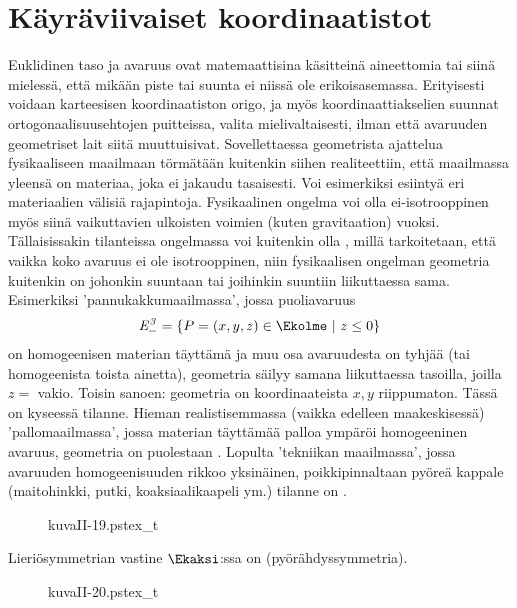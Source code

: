\section{Käyräviivaiset koordinaatistot} \label{koordinaatistot}
\alku
Euklidinen taso ja avaruus ovat matemaattisina käsitteinä aineettomia tai  
siinä mielessä, että mikään piste tai suunta ei niissä ole erikoisasemassa. Erityisesti voidaan
karteesisen koordinaatiston origo, ja myös koordinaattiakselien suunnat 
ortogonaalisuusehtojen puitteissa, valita mielivaltaisesti, ilman että avaruuden geometriset 
lait siitä muuttuisivat. Sovellettaessa geometrista ajattelua fysikaaliseen maailmaan törmätään
kuitenkin siihen realiteettiin, että maailmassa yleensä on materiaa, joka ei jakaudu tasaisesti.
Voi esimerkiksi esiintyä eri materiaalien välisiä rajapintoja. Fysikaalinen ongelma voi olla
ei-isotrooppinen myös siinä vaikuttavien ulkoisten voimien (kuten gravitaation) vuoksi. 
Tällaisissakin tilanteissa ongelmassa voi kuitenkin olla , millä tarkoitetaan,
että vaikka koko avaruus ei ole isotrooppinen, niin fysikaalisen ongelman geometria kuitenkin on
johonkin suuntaan tai joihinkin suuntiin liikuttaessa sama. Esimerkiksi 'pannukakkumaailmassa',
jossa puoliavaruus
\[
\mathit{E}_-^{\mathit{3}} = \{P=(x,y,z) \in \Ekolme \ | \ z \leq 0 \}
\]
on homogeenisen materian täyttämä ja muu osa avaruudesta on tyhjää (tai homogeenista toista 
ainetta), geometria säilyy samana liikuttaessa tasoilla, joilla $z=$ vakio. Toisin sanoen: 
geometria on koordinaateista $x,y$ riippumaton. Tässä on kyseessä  tilanne.
Hieman realistisemmassa (vaikka edelleen maakeskisessä) 'pallomaailmassa', jossa materian 
täyttämää palloa ympäröi homogeeninen avaruus, geometria on puolestaan .
Lopulta 'tekniikan maailmassa', jossa avaruuden homogeenisuuden rikkoo yksinäinen, 
poikkipinnaltaan pyöreä kappale (maitohinkki, putki, koaksiaalikaapeli ym.) tilanne on 
.
\begin{figure}[H]
\begin{center}
{kuvaII-19.pstex_t}
\end{center}
\end{figure}
Lieriösymmetrian vastine $\Ekaksi$:ssa on  (pyörähdyssymmetria).
\begin{figure}[H]
\begin{center}
{kuvaII-20.pstex_t}
\end{center}
\end{figure}

